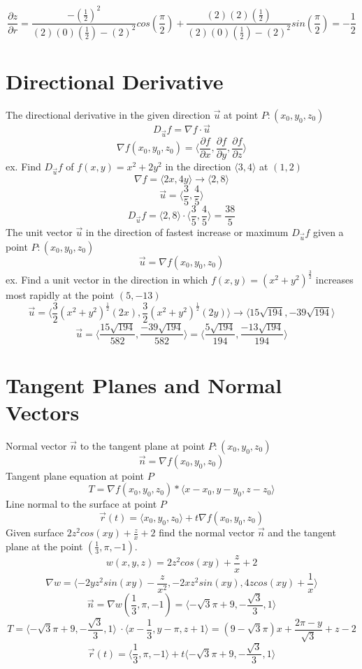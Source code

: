 \documentclass{article}
\begin{document}
\[\frac{\partial z}{\partial r} = \frac{-(\frac{1}{2})^2}{(2)(0)(\frac{1}{2})-(2)^2}cos(\frac{\pi}{2}) + \frac{(2)(2)(\frac{1}{2})}{(2)(0)(\frac{1}{2})-(2)^2}sin(\frac{\pi}{2}) = -\frac{1}{2}\]

\section{Directional Derivative}
The directional derivative in the given direction $\Vec{u}$ at point $P:(x_0, y_0, z_0)$
\[D_{\Vec{u}}f = \nabla f \cdot \Vec{u}\]
\[\nabla f(x_0,y_0,z_0) = \langle\frac{\partial f}{\partial x}, \frac{\partial f}{\partial y}, \frac{\partial f}{\partial z}\rangle\]
ex. Find $D_{\Vec{u}}f$ of $f(x,y)=x^2+2y^2$ in the direction $\langle 3, 4 \rangle$ at $(1, 2)$
\[\nabla f = \langle 2x, 4y \rangle \to \langle 2, 8 \rangle \]
\[\Vec{u} = \langle \frac{3}{5}, \frac{4}{5} \rangle \]
\[D_{\Vec{u}}f = \langle 2, 8 \rangle \cdot \langle \frac{3}{5}, \frac{4}{5} \rangle = \frac{38}{5} \]
The unit vector $\Vec{u}$ in the direction of fastest increase or maximum $D_{\Vec{u}}f$ given a point $P:(x_0, y_0, z_0)$
\[\Vec{u} = \nabla f(x_0,y_0,z_0)\]
ex. Find a unit vector in the direction in which $f(x,y)=(x^2+y^2)^\frac{3}{2}$ increases most rapidly at the point $(5, -13)$
\[\Vec{u} = \langle \frac{3}{2}(x^2+y^2)^\frac{1}{2}(2x), \frac{3}{2}(x^2+y^2)^\frac{1}{2}(2y) \rangle \to \langle 15\sqrt{194}, -39\sqrt{194}\rangle \]
\[\Vec{u} = \langle \frac{15\sqrt{194}}{582}, \frac{-39\sqrt{194}}{582} \rangle = \langle \frac{5\sqrt{194}}{194}, \frac{-13\sqrt{194}}{194} \rangle \]

\section{Tangent Planes and Normal Vectors}
Normal vector $\Vec{n}$ to the tangent plane at point $P: (x_0, y_0, z_0)$ 
\[\Vec{n} = \nabla f(x_0, y_0, z_0)\]
Tangent plane equation at point $P$
\[T = \nabla f(x_0, y_0, z_0) * \langle x-x_0, y-y_0, z-z_0 \rangle\]
Line normal to the surface at point $P$
\[\Vec{r}(t) = \langle x_0, y_0, z_0 \rangle + t\nabla f(x_0,y_0,z_0)\]
Given surface $2z^2cos(xy)+\frac{z}{x}+2$ find the normal vector $\Vec{n}$ and the tangent plane at the point $(\frac{1}{3}, \pi, -1)$.
\[w(x,y,z)=2z^2cos(xy)+\frac{z}{x}+2\]
\[\nabla w = \langle -2yz^2sin(xy) - \frac{z}{x^2}, -2xz^2sin(xy), 4zcos(xy) + \frac{1}{x} \rangle\]
\[\Vec{n} = \nabla w(\frac{1}{3}, \pi, -1) = \langle -\sqrt{3}\pi+9, -\frac{\sqrt{3}}{3}, 1 \rangle\]
\[T = \langle -\sqrt{3}\pi+9, -\frac{\sqrt{3}}{3}, 1 \rangle\ \cdot \langle x-\frac{1}{3}, y-\pi, z+1 \rangle = (9-\sqrt{3}\pi)x+\frac{2\pi -y}{\sqrt{3}}+z-2\]
\[\Vec{r}(t) = \langle \frac{1}{3}, \pi, -1 \rangle + t\langle -\sqrt{3}\pi+9, -\frac{\sqrt{3}}{3}, 1 \rangle \]
\end{document}
